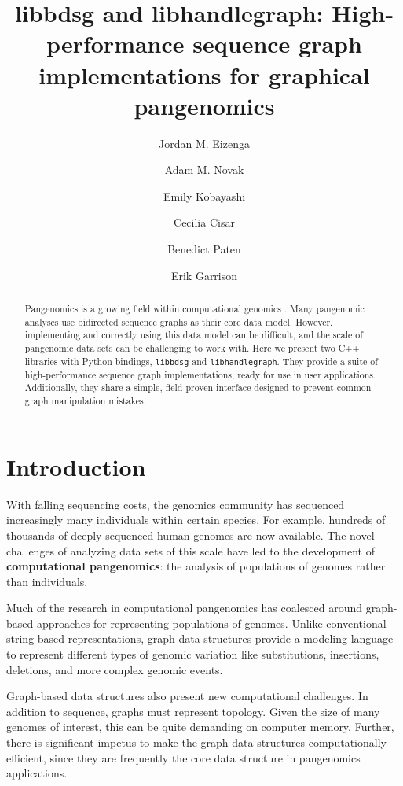 \documentclass{article}
\title{libbdsg and libhandlegraph: High-performance sequence graph implementations for graphical pangenomics}
\author{Jordan M. Eizenga \and Adam M. Novak \and Emily Kobayashi \and Cecilia Cisar \and Benedict Paten \and Erik Garrison}
\newcommand{\vocab}{\textbf}
\begin{document}
\maketitle

\begin{abstract}

Pangenomics is a growing field within computational genomics \cite{computational2016computational}. Many pangenomic analyses use bidirected sequence graphs as their core data model. However, implementing and correctly using this data model can be difficult, and the scale of pangenomic data sets can be challenging to work with. Here we present two C++ libraries with Python bindings, \texttt{libbdsg} and \texttt{libhandlegraph}. They provide a suite of high-performance sequence graph implementations, ready for use in user applications. Additionally, they share a simple, field-proven interface designed to prevent common graph manipulation mistakes.

\end{abstract}

\section{Introduction}

With falling sequencing costs, the genomics community has sequenced increasingly many individuals within certain species. For example, hundreds of thousands of deeply sequenced human genomes are now available. The novel challenges of analyzing data sets of this scale have led to the development of \vocab{computational pangenomics}: the analysis of populations of genomes rather than individuals.

Much of the research in computational pangenomics has coalesced around graph-based approaches for representing populations of genomes. Unlike conventional string-based representations, graph data structures provide a modeling language to represent different types of genomic variation like substitutions, insertions, deletions, and more complex genomic events. 

Graph-based data structures also present new computational challenges. In addition to sequence, graphs must represent topology. Given the size of many genomes of interest, this can be quite demanding on computer memory. Further, there is significant impetus to make the graph data structures computationally efficient, since they are frequently the core data structure in pangenomics applications.
\end{document}
